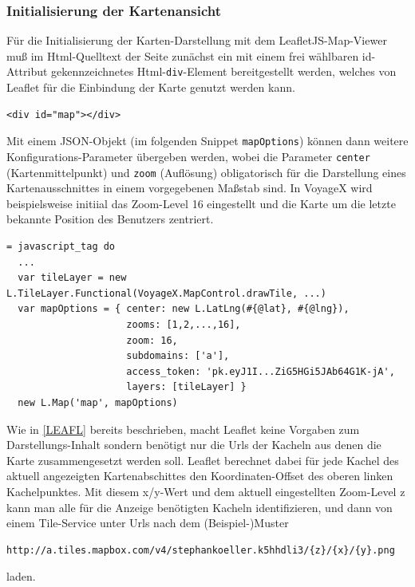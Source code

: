\subsubsection{Initialisierung der Kartenansicht}\label{5_DARS_KART}
Für die Initialisierung der Karten-Darstellung mit dem LeafletJS-Map-Viewer muß im Html-Quelltext der Seite zunächst ein mit einem frei wählbaren id-Attribut gekennzeichnetes Html-\texttt{div}-Element bereitgestellt werden, welches von Leaflet für die Einbindung der Karte genutzt werden kann.
\lstset{language=Html5}
\begin{lstlisting}[frame=single,numbers=none,xleftmargin=0pt]
<div id="map"></div>
\end{lstlisting}
Mit einem JSON-Objekt (im folgenden Snippet \texttt{mapOptions}) können dann weitere Konfigurations-Parameter übergeben werden, wobei die Parameter \texttt{center} (Kartenmittelpunkt) und \texttt{zoom} (Auflösung) obligatorisch für die Darstellung eines Kartenausschnittes in einem vorgegebenen Maßstab sind. In VoyageX wird beispielsweise
initiial das Zoom-Level 16 eingestellt und die Karte um die letzte bekannte Position des Benutzers zentriert.
\lstset{language=JavaScript}
\begin{lstlisting}[frame=single,xleftmargin=0pt,caption={Initialisierung der Karte in einer Haml-Datei},captionpos=b,label={lst:CL_MapInit}]
= javascript_tag do
  ...
  var tileLayer = new L.TileLayer.Functional(VoyageX.MapControl.drawTile, ...)
  var mapOptions = { center: new L.LatLng(#{@lat}, #{@lng}),
   				   	 zooms: [1,2,...,16],
   				   	 zoom: 16,
   				   	 subdomains: ['a'],
   				   	 access_token: 'pk.eyJ1I...ZiG5HGi5JAb64G1K-jA',
   				   	 layers: [tileLayer] }
  new L.Map('map', mapOptions)
\end{lstlisting} \vspace{0.8cm}
\noindent Wie in \ref{LEAFL} bereits beschrieben, macht Leaflet keine Vorgaben zum Darstellungs-Inhalt sondern benötigt nur die Urls der Kacheln aus denen die Karte zusammengesetzt werden soll. Leaflet berechnet dabei für jede Kachel des aktuell angezeigten Kartenabschittes den Koordinaten-Offset des oberen linken Kachelpunktes. Mit diesem x/y-Wert und dem aktuell eingestellten Zoom-Level z kann man alle für die Anzeige benötigten Kacheln identifizieren, und dann von einem Tile-Service unter Urls nach dem (Beispiel-)Muster 
\lstset{language=JavaScript}
\begin{lstlisting}[frame=single,numbers=none,xleftmargin=0pt,caption={Kachel-Bild-Url-Template},captionpos=b,label={lst:CL_TSPUTempl}]
http://a.tiles.mapbox.com/v4/stephankoeller.k5hhdli3/{z}/{x}/{y}.png
\end{lstlisting}%
laden.

